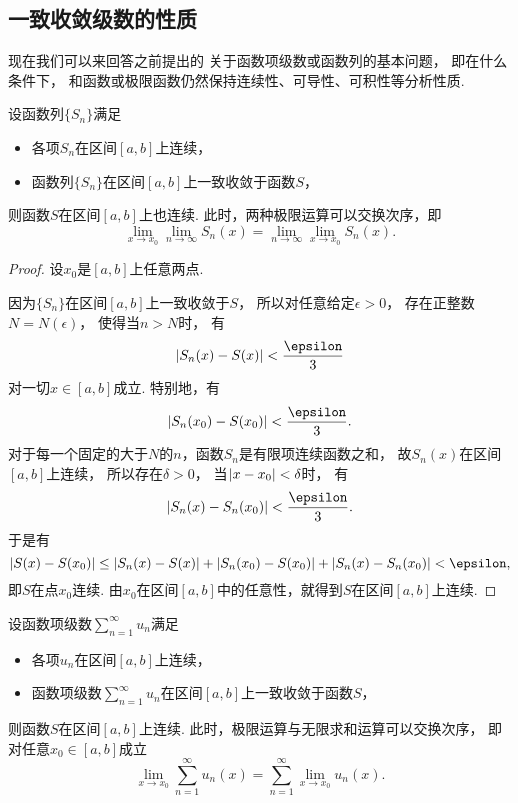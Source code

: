 \subsection{一致收敛级数的性质}
现在我们可以来回答之前提出的
关于函数项级数或函数列的基本问题，
即在什么条件下，
和函数或极限函数仍然保持连续性、可导性、可积性等分析性质.

\begin{theorem}\label{theorem:函数项级数.连续函数列的一致收敛性保证极限函数的连续性}
设函数列\(\{S_n\}\)满足\begin{itemize}
	\item 各项\(S_n\)在区间\([a,b]\)上连续，
	\item 函数列\(\{S_n\}\)在区间\([a,b]\)上一致收敛于函数\(S\)，
\end{itemize}
则函数\(S\)在区间\([a,b]\)上也连续.
此时，两种极限运算可以交换次序，即\[
	\lim_{x \to x_0} \lim_{n\to\infty} S_n(x)
	= \lim_{n\to\infty} \lim_{x \to x_0} S_n(x).
\]
\begin{proof}
设\(x_0\)是\([a,b]\)上任意两点.

因为\(\{S_n\}\)在区间\([a,b]\)上一致收敛于\(S\)，
所以对任意给定\(\epsilon>0\)，
存在正整数\(N = N(\epsilon)\)，
使得当\(n>N\)时，
有\[
	\abs{S_n(x) - S(x)} < \frac\epsilon3
\]对一切\(x\in[a,b]\)成立.
特别地，有\[
	\abs{S_n(x_0) - S(x_0)} < \frac\epsilon3.
\]
对于每一个固定的大于\(N\)的\(n\)，函数\(S_n\)是有限项连续函数之和，
故\(S_n(x)\)在区间\([a,b]\)上连续，
所以存在\(\delta>0\)，
当\(\abs{x - x_0} < \delta\)时，
有\[
	\abs{S_n(x) - S_n(x_0)} < \frac\epsilon3.
\]
于是有\[
	\abs{S(x) - S(x_0)}
	\leq \abs{S_n(x) - S(x)}
		+ \abs{S_n(x_0) - S(x_0)}
		+ \abs{S_n(x) - S_n(x_0)}
	< \epsilon,
\]
即\(S\)在点\(x_0\)连续.
由\(x_0\)在区间\([a,b]\)中的任意性，就得到\(S\)在区间\([a,b]\)上连续.
\end{proof}
\end{theorem}
\begin{theorem}\label{theorem:函数项级数.连续函数项级数的一致收敛性保证和函数的连续性}
设函数项级数\(\sum_{n=1}^\infty u_n\)满足\begin{itemize}
	\item 各项\(u_n\)在区间\([a,b]\)上连续，
	\item 函数项级数\(\sum_{n=1}^\infty u_n\)在区间\([a,b]\)上一致收敛于函数\(S\)，
\end{itemize}
则函数\(S\)在区间\([a,b]\)上连续.
此时，极限运算与无限求和运算可以交换次序，
即对任意\(x_0\in[a,b]\)成立\[
	\lim_{x \to x_0} \sum_{n=1}^\infty u_n(x)
	= \sum_{n=1}^\infty \lim_{x \to x_0} u_n(x).
\]
\end{theorem}
